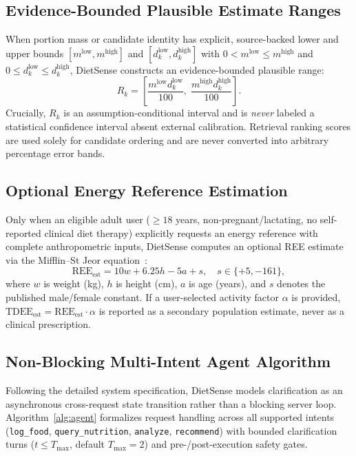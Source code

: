 \documentclass[conference]{IEEEtran}
\begin{document}
\subsection{Evidence-Bounded Plausible Estimate Ranges}
When portion mass or candidate identity has explicit, source-backed lower and upper bounds $[m^{\text{low}}, m^{\text{high}}]$ and $[d_k^{\text{low}}, d_k^{\text{high}}]$ with $0 < m^{\text{low}} \le m^{\text{high}}$ and $0 \le d_k^{\text{low}} \le d_k^{\text{high}}$, DietSense constructs an evidence-bounded plausible range:
\begin{equation}
R_k = \left[\frac{m^{\text{low}} d_k^{\text{low}}}{100},\; \frac{m^{\text{high}} d_k^{\text{high}}}{100}\right].
\label{eq:range}
\end{equation}
Crucially, $R_k$ is an assumption-conditional interval and is \emph{never} labeled a statistical confidence interval absent external calibration. Retrieval ranking scores are used solely for candidate ordering and are never converted into arbitrary percentage error bands.

\subsection{Optional Energy Reference Estimation}
Only when an eligible adult user ($\ge 18$ years, non-pregnant/lactating, no self-reported clinical diet therapy) explicitly requests an energy reference with complete anthropometric inputs, DietSense computes an optional REE estimate via the Mifflin--St Jeor equation~\cite{mifflin1990ree}:
\begin{equation}
\text{REE}_{\text{est}} = 10 w + 6.25 h - 5 a + s, \quad s \in \{+5, -161\},
\label{eq:mifflin}
\end{equation}
where $w$ is weight (kg), $h$ is height (cm), $a$ is age (years), and $s$ denotes the published male/female constant. If a user-selected activity factor $\alpha$ is provided, $\text{TDEE}_{\text{est}} = \text{REE}_{\text{est}} \cdot \alpha$ is reported as a secondary population estimate, never as a clinical prescription.

\subsection{Non-Blocking Multi-Intent Agent Algorithm}
Following the detailed system specification, DietSense models clarification as an asynchronous cross-request state transition rather than a blocking server loop. Algorithm~\ref{alg:agent} formalizes request handling across all supported intents (\texttt{log\_food}, \texttt{query\_nutrition}, \texttt{analyze}, \texttt{recommend}) with bounded clarification turns ($t \le T_{\max}$, default $T_{\max}=2$) and pre-/post-execution safety gates.
\end{document}
